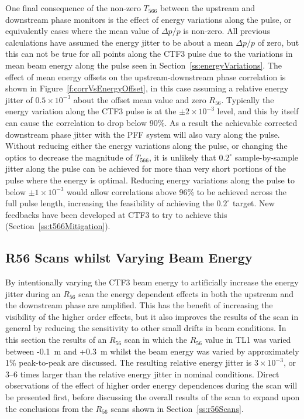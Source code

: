 One final consequence of the non-zero \(T_{566}\) between the upstream and downstream phase monitors is the effect of energy variations along the pulse, or equivalently cases where the mean value of \(\Delta p/p\) is non-zero. All previous calculations have assumed the energy jitter to be about a mean \(\Delta p / p\) of zero, but this can not be true for all points along the CTF3 pulse due to the variations in mean beam energy along the pulse seen in Section~\ref{ss:energyVariations}. The effect of mean energy offsets on the upstream-downstream phase correlation is shown in Figure~\ref{f:corrVsEnergyOffset}, in this case assuming a relative energy jitter of \(0.5\times10^{-3}\) about the offset mean value and zero \(R_{56}\). Typically the energy variation along the CTF3 pulse is at the \(\pm2\times10^{-3}\) level, and this by itself can cause the correlation to drop below 90\%. As a result the achievable corrected downstream phase jitter with the PFF system will also vary along the pulse. Without reducing either the energy variations along the pulse, or changing the optics to decrease the magnitude of \(T_{566}\), it is unlikely that \(0.2^\circ\) sample-by-sample jitter along the pulse can be achieved for more than very short portions of the pulse where the energy is optimal. Reducing energy variations along the pulse to below \(\pm1 \times10^{-3}\) would allow correlations above 96\% to be achieved across the full pulse length, increasing the feasibility of achieving the \(0.2^\circ\) target. New feedbacks have been developed at CTF3 to try to achieve this (Section~\ref{ss:t566Mitigation}).



\subsection{R56 Scans whilst Varying Beam Energy}
\label{ss:r56ScanWithEnergy}

By intentionally varying the CTF3 beam energy to artificially increase the energy jitter during an \(R_{56}\) scan the energy dependent effects in both the upstream and the downstream phase are amplified. This has the benefit of increasing the visibility of the higher order effects, but it also improves the results of the scan in general by reducing the sensitivity to other small drifts in beam conditions. In this section the results of an \(R_{56}\) scan in which the \(R_{56}\) value in TL1 was varied between -0.1~m and +0.3~m whilst the beam energy was varied by approximately 1\% peak-to-peak are discussed. The resulting relative energy jitter is \(3\times10^{-3}\), or 3--6 times larger than the relative energy jitter in nominal conditions. Direct observations of the effect of higher order energy dependences during the scan will be presented first, before discussing the overall results of the scan to expand upon the conclusions from the \(R_{56}\) scans shown in Section~\ref{ss:r56Scans}.

